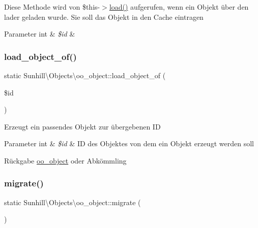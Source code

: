 Diese Methode wird von \$this-\/$>$\hyperlink{classSunhill_1_1propertieshaving_a44f6fba3f525b0b7b8f13610b4691394}{load()} aufgerufen, wenn ein Objekt über den lader geladen wurde. Sie soll das Objekt in den Cache eintragen 
\begin{DoxyParams}[1]{Parameter}
int & {\em \$id} & \\
\hline
\end{DoxyParams}
\mbox{\label{classSunhill_1_1Objects_1_1oo__object_ad536a3127b14d9459f6b6f3d11645673}} 
\subsubsection{\texorpdfstring{load\+\_\+object\+\_\+of()}{load\_object\_of()}}
{\footnotesize\ttfamily static Sunhill\textbackslash{}\+Objects\textbackslash{}oo\+\_\+object\+::load\+\_\+object\+\_\+of (\begin{DoxyParamCaption}\item[{}]{\$id }\end{DoxyParamCaption})\hspace{0.3cm}{\ttfamily [static]}}

Erzeugt ein passendes Objekt zur übergebenen ID 
\begin{DoxyParams}[1]{Parameter}
int & {\em \$id} & ID des Objektes von dem ein Objekt erzeugt werden soll \\
\hline
\end{DoxyParams}
\begin{DoxyReturn}{Rückgabe}
\hyperlink{classSunhill_1_1Objects_1_1oo__object}{oo\+\_\+object} oder Abkömmling 
\end{DoxyReturn}
\mbox{\label{classSunhill_1_1Objects_1_1oo__object_a6d3279a181139bb0d555cb817bef0190}} 
\subsubsection{\texorpdfstring{migrate()}{migrate()}}
{\footnotesize\ttfamily static Sunhill\textbackslash{}\+Objects\textbackslash{}oo\+\_\+object\+::migrate (\begin{DoxyParamCaption}{ }\end{DoxyParamCaption})\hspace{0.3cm}{\ttfamily [static]}}

